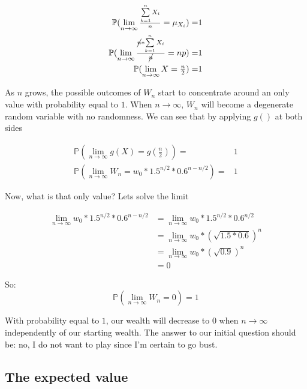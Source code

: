 \documentclass[12pt]{article}
\begin{document}
\begin{equation*}
  \begin{split}
    \mathbb{P}(\lim_{n\to\infty} \tfrac{\sum\limits_{k=1}^{n} X_i}{n} = \mu_{X_i}) =& 1\\
    \mathbb{P}(\lim_{n\to\infty} \tfrac{\cancel{n}*\sum\limits_{k=1}^{n} X_i}{\cancel{n}} = np) =& 1\\
    \mathbb{P}(\lim_{n\to\infty} X = \tfrac{n}{2}) =& 1
  \end{split}
\end{equation*}

As $n$ grows, the possible outcomes of $W_n$ start to concentrate around an only value with probability equal to $1$. When $n \rightarrow \infty$, $W_n$ will become a degenerate random variable with no randomness. We can see that by applying $g()$ at both sides

\begin{equation*}
  \begin{split}
    \mathbb{P}(\lim_{n\to\infty} g(X) = g(\tfrac{n}{2})) =& 1\\
    \mathbb{P}(\lim_{n\to\infty} W_n = w_0 * 1.5^{n/2} * 0.6^{n-n/2}) =& 1
    \end{split}
\end{equation*}

Now, what is that only value? Lets solve the limit

\begin{equation*}
  \begin{split}
    \lim_{n\to\infty} w_0 * 1.5^{n/2} * 0.6^{n-n/2} & = \lim_{n\to\infty}w_0 * 1.5^{n/2} * 0.6^{n/2} \\
    &= \lim_{n\to\infty}w_0 * (\sqrt{1.5*0.6})^{n}\\
    &= \lim_{n\to\infty}w_0 * (\sqrt{0.9}) ^{n}\\
    &= 0
  \end{split}
\end{equation*}

So:
\begin{equation*}
    \mathbb{P}(\lim_{n\to\infty} W_n = 0) = 1
\end{equation*}

With probability equal to $1$, our wealth will decrease to 0 when $n\to\infty$ independently of our starting wealth. The answer to our initial question should be: no, I do not want to play since I'm certain to go bust.

\subsection{The expected value}
\end{document}
